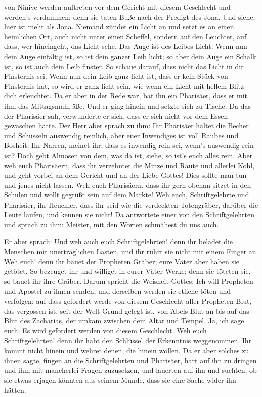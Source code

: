 von Ninive werden auftreten vor dem Gericht mit diesem Geschlecht und
werden's verdammen; denn sie taten Buße nach der Predigt des Jona. Und
siehe, hier ist mehr als Jona.  Niemand zündet ein Licht
an und setzt es an einen heimlichen Ort, auch nicht unter einen
Scheffel, sondern auf den Leuchter, auf dass, wer hineingeht, das Licht
sehe.  Das Auge ist des Leibes Licht. Wenn nun dein Auge
einfältig ist, so ist dein ganzer Leib licht; so aber dein Auge ein
Schalk ist, so ist auch dein Leib finster.  So schaue
darauf, dass nicht das Licht in dir Finsternis sei.  Wenn
nun dein Leib ganz licht ist, dass er kein Stück von Finsternis hat, so
wird er ganz licht sein, wie wenn ein Licht mit hellem Blitz dich
erleuchtet.  Da er aber in der Rede war, bat ihn ein
Pharisäer, dass er mit ihm das Mittagsmahl äße. Und er ging hinein und
setzte sich zu Tische.  Da das der Pharisäer sah,
verwunderte er sich, dass er sich nicht vor dem Essen gewaschen hätte.
 Der Herr aber sprach zu ihm: Ihr Pharisäer haltet die
Becher und Schüsseln auswendig reinlich, aber euer Inwendiges ist voll
Raubes und Bosheit.  Ihr Narren, meinet ihr, dass es
inwendig rein sei, wenn's auswendig rein ist?  Doch gebt
Almosen von dem, was da ist, siehe, so ist's euch alles rein.
 Aber weh euch Pharisäern, dass ihr verzehntet die Minze
und Raute und allerlei Kohl, und geht vorbei an dem Gericht und an der
Liebe Gottes! Dies sollte man tun und jenes nicht lassen.
 Weh euch Pharisäern, dass ihr gern obenan sitzet in den
Schulen und wollt gegrüßt sein auf dem Markte!  Weh euch,
Schriftgelehrte und Pharisäer, ihr Heuchler, dass ihr seid wie die
verdeckten Totengräber, darüber die Leute laufen, und kennen sie nicht!
 Da antwortete einer von den Schriftgelehrten und sprach
zu ihm: Meister, mit den Worten schmähest du uns auch.

 Er aber sprach: Und weh auch euch Schriftgelehrten! denn
ihr beladet die Menschen mit unerträglichen Lasten, und ihr rührt sie
nicht mit einem Finger an.  Weh euch! denn ihr bauet der
Propheten Gräber; eure Väter aber haben sie getötet.  So
bezeuget ihr und williget in eurer Väter Werke; denn sie töteten sie, so
bauet ihr ihre Gräber.  Darum spricht die Weisheit
Gottes: Ich will Propheten und Apostel zu ihnen senden, und derselben
werden sie etliche töten und verfolgen;  auf dass
gefordert werde von diesem Geschlecht aller Propheten Blut, das
vergossen ist, seit der Welt Grund gelegt ist,  von Abels
Blut an bis auf das Blut des Zacharias, der umkam zwischen dem Altar und
Tempel. Ja, ich sage euch: Es wird gefordert werden von diesem
Geschlecht.  Weh euch Schriftgelehrten! denn ihr habt den
Schlüssel der Erkenntnis weggenommen. Ihr kommt nicht hinein und wehret
denen, die hinein wollen.  Da er aber solches zu ihnen
sagte, fingen an die Schriftgelehrten und Pharisäer, hart auf ihn zu
dringen und ihm mit mancherlei Fragen zuzusetzen,  und
lauerten auf ihn und suchten, ob sie etwas erjagen könnten aus seinem
Munde, dass sie eine Sache wider ihn hätten.


